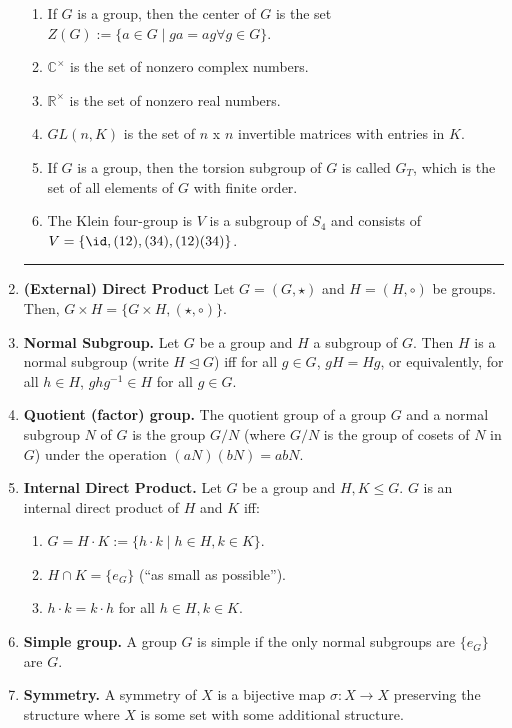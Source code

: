 \begin{enumerate}
\begin{enumerate}
		\item If $G$ is a group, then the center of $G$ is the set $Z(G) := \{a \in G \mid ga=ag \forall g \in G\}$. 
		\item $\mathbb{C}^\times$ is the set of nonzero complex numbers. 
		\item $\mathbb{R}^\times$ is the set of nonzero real numbers. 
		\item $GL(n,K)$ is the set of $n$ x $n$ invertible matrices with entries in $K$. 
		\item If $G$ is a group, then the torsion subgroup of $G$ is called $G_T$, which is the set of all elements of $G$ with finite order.
		\item The Klein four-group is $V$ is a subgroup of $S_4$ and consists of $V=\{\id, (12), (34), (12)(34)\}$. 
	\end{enumerate} 
	\begin{center}
		\hrule
	\end{center}
	\item \textbf{(External) Direct Product} Let $G = (G,\star)$ and $H = (H, \circ)$ be groups. Then, $G \times H = \{G \times H, (\star, \circ)\}$. 
	\item \textbf{Normal Subgroup. } Let $G$ be a group and $H$ a subgroup of $G$. Then $H$ is a normal subgroup (write $H \unlhd G$) iff for all $g \in G$, $gH=Hg$, or equivalently, for all $h \in H$, $ghg^{-1} \in H$ for all $g \in G$. 
	\item \textbf{Quotient (factor) group. } The quotient group of a group $G$ and a normal subgroup $N$ of $G$ is the group $G/N$ (where $G/N$ is the group of cosets of $N$ in $G$) under the operation $(aN)(bN) = abN$. 
	\item \textbf{Internal Direct Product. } Let $G$ be a group and $H,K \leq G$. $G$ is an internal direct product of $H$ and $K$ iff: 
	\begin{enumerate}
		\item $G=H \cdot K := \{h \cdot k \mid h \in H, k \in K\}$. 
		\item $H \cap K = \{e_G\}$ (\enquote{as small as possible}). 
		\item $h \cdot k = k \cdot h$ for all $h \in H, k \in K$. 
	\end{enumerate}
	\item \textbf{Simple group. } A group $G$ is simple if the only normal subgroups are $\{e_G\}$ are $G$. 
	\item \textbf{Symmetry. } A symmetry of $X$ is a bijective map $\sigma: X \to X$ preserving the structure where $X$ is some set with some additional structure. 

\end{enumerate}
